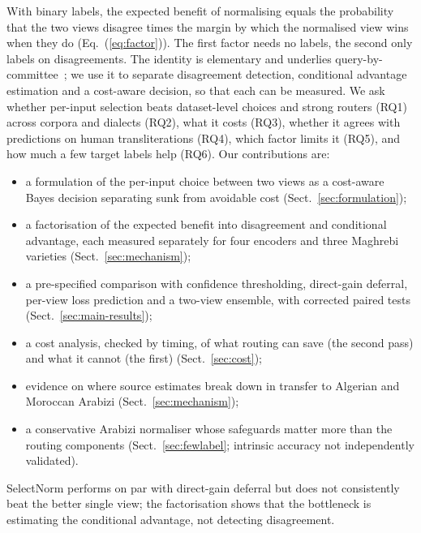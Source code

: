 With binary labels, the expected benefit of normalising equals the probability that the two views disagree times the margin by which the normalised view wins when they do (Eq.~(\ref{eq:factor})). The first factor needs no labels, the second only labels on disagreements. The identity is elementary and underlies query-by-committee~\cite{seung1992qbc}; we use it to separate disagreement detection, conditional advantage estimation and a cost-aware decision, so that each can be measured. We ask whether per-input selection beats dataset-level choices and strong routers (RQ1) across corpora and dialects (RQ2), what it costs (RQ3), whether it agrees with predictions on human transliterations (RQ4), which factor limits it (RQ5), and how much a few target labels help (RQ6). Our contributions are:
\begin{itemize}[leftmargin=1.2em,itemsep=0pt,topsep=2pt]
\item a formulation of the per-input choice between two views as a cost-aware Bayes decision separating sunk from avoidable cost (Sect.~\ref{sec:formulation});
\item a factorisation of the expected benefit into disagreement and conditional advantage, each measured separately for four encoders and three Maghrebi varieties (Sect.~\ref{sec:mechanism});
\item a pre-specified comparison with confidence thresholding, direct-gain deferral, per-view loss prediction and a two-view ensemble, with corrected paired tests (Sect.~\ref{sec:main-results});
\item a cost analysis, checked by timing, of what routing can save (the second pass) and what it cannot (the first) (Sect.~\ref{sec:cost});
\item evidence on where source estimates break down in transfer to Algerian and Moroccan Arabizi (Sect.~\ref{sec:mechanism});
\item a conservative Arabizi normaliser whose safeguards matter more than the routing components (Sect.~\ref{sec:fewlabel}; intrinsic accuracy not independently validated).
\end{itemize}
SelectNorm performs on par with direct-gain deferral but does not consistently beat the better single view; the factorisation shows that the bottleneck is estimating the conditional advantage, not detecting disagreement.
